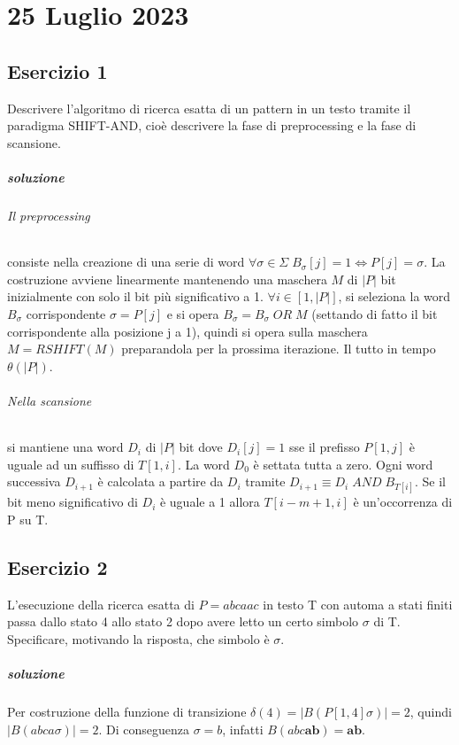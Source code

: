 \chapter{25 Luglio 2023}

\section{Esercizio 1}

Descrivere l'algoritmo di ricerca esatta di un pattern in un testo tramite il paradigma SHIFT-AND, cio\`e descrivere la fase di preprocessing e la fase di scansione.

\paragraph{soluzione}

\subparagraph{Il preprocessing} consiste nella creazione di una serie di word $\forall \sigma \in \Sigma \; B_\sigma[j] = 1 \Leftrightarrow P[j] = \sigma$. La costruzione avviene linearmente mantenendo una maschera $M$ di $|P|$ bit inizialmente con solo il bit pi\`u significativo a 1. $\forall i \in [1,|P|]$, si seleziona la word $B_\sigma$ corrispondente $\sigma = P[j]$ e si opera $B_\sigma = B_\sigma \; OR \; M$ (settando di fatto il bit corrispondente alla posizione j a 1), quindi si opera sulla maschera $M = RSHIFT(M)$ preparandola per la prossima iterazione. Il tutto in tempo $\theta(|P|)$.

\subparagraph{Nella scansione} si mantiene una word $D_i$ di $|P|$ bit dove $D_i[j] = 1$ sse il prefisso $P[1,j]$ \`e uguale ad un suffisso di $T[1,i]$. La word $D_0$ \`e settata tutta a zero. Ogni word successiva $D_{i+1}$ \`e calcolata a partire da $D_{i}$ tramite $D_{i+1} \equiv D_{i} \; AND \; B_{T[i]}$. Se il bit meno significativo di $D_i$ \`e uguale a 1 allora $T[i-m+1,i]$ \`e un'occorrenza di P su T.

\section{Esercizio 2}

L'esecuzione della ricerca esatta di $P = abcaac$ in testo T con automa a stati finiti passa dallo stato 4 allo stato 2 dopo avere letto un certo simbolo $\sigma$ di T.
Specificare, motivando la risposta, che simbolo \`e $\sigma$.

\paragraph{soluzione} Per costruzione della funzione di transizione $\delta(4) = |B(P[1,4]\sigma)| = 2$, quindi $|B(abca\sigma)| = 2$. Di conseguenza $\sigma = b$, infatti $B(abc\textbf{ab}) = \textbf{ab}$.

